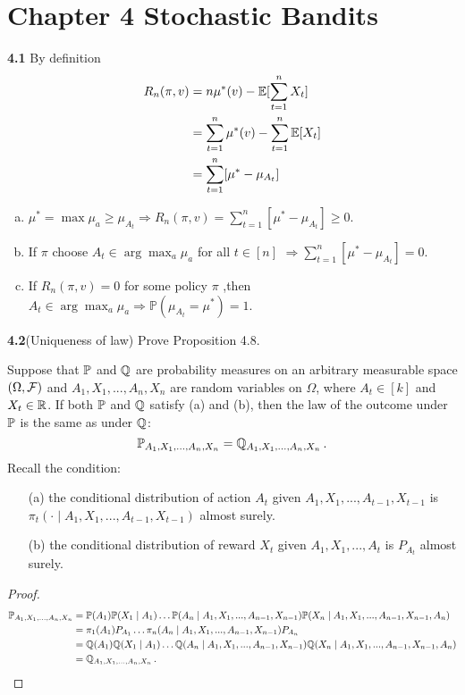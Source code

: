 \chapter*{Chapter 4 Stochastic Bandits}
\label{sec:4}

\noindent\textbf{4.1}
By definition
\begin{align}
R_n(\pi,v) &=n\mu^*(v)-\mathbb{E}[\sum^n_{t=1}X_t]\notag\\
&=\sum^n_{t=1}\mu^*(v)-\sum^n_{t=1}\mathbb{E}[X_t]\notag\\
&=\sum^n_{t=1}[\mu^*-\mu_{A_t}]\notag
\end{align}
\begin{enumerate}[(a)]
    \item $\mu^*=\max\mu_a\ge\mu_{A_t} \Rightarrow R_n(\pi,v)=\sum^n_{t=1}[\mu^*-\mu_{A_t}]\ge0$.

    \item If $\pi$ choose $A_t \in \arg\max_a\mu_a$ for all $t\in[n]$ $\Rightarrow \sum^n_{t=1}[\mu^*-\mu_{A_t}]=0$.

\item If $R_n(\pi,v)=0$ for some policy $\pi$ ,then $A_t \in \arg\max_a\mu_a \Rightarrow \mathbb{P}(\mu_{A_t}=\mu^*)=1$.
\end{enumerate}



\noindent\textbf{4.2}(Uniqueness of law) Prove Proposition 4.8. 
\begin{proposition}
Suppose that $\mathbb{P}$ and $\mathbb{Q}$ are probability measures on an arbitrary measurable space $(\Omega,\mathcal{F})$ and $A_1,X_1,...,A_n,X_n$ are random variables on $\Omega$, where $A_t\in [k]$ and $X_t\in\mathbb{R}$. If both $\mathbb{P}$ and $\mathbb{Q}$ satisfy (a) and (b), then the law of the outcome under $\mathbb{P}$ is the same as under $\mathbb{Q}$: 
$$\mathbb{P}_{A_1,X_1,...,A_n,X_n}=\mathbb{Q}_{A_1,X_1,...,A_n,X_n}\,.$$
Recall the condition:
\begin{enumerate}
    \item[(a)] the conditional distribution of action $A_t$ given $A_1,X_1,...,A_{t-1},X_{t-1}$ is $\pi_t(\cdot \mid A_1,X_1,...,A_{t-1},X_{t-1})$ almost surely.
    \item[(b)] the conditional distribution of reward $X_t$ given $A_1,X_1,...,A_{t}$ is $P_{A_t}$ almost surely.
\end{enumerate}
\end{proposition}

\begin{proof}
    \begin{align*}
        \mathbb{P}_{A_1,X_1,...,A_n,X_n} &= \mathbb{P}(A_1) \mathbb{P}(X_1\mid A_1)\ldots \mathbb{P}(A_n \mid A_1,X_1,...,A_{n-1},X_{n-1}) \mathbb{P}(X_n \mid A_1,X_1,...,A_{n-1},X_{n-1},A_n) \\
        &= \pi_1(A_1) P_{A_1}\ldots \pi_n(A_n\mid A_1,X_1,...,A_{n-1},X_{n-1} ) P_{A_n}\\
        &= \mathbb{Q}(A_1) \mathbb{Q}(X_1\mid A_1)\ldots \mathbb{Q}(A_n \mid A_1,X_1,...,A_{n-1},X_{n-1}) \mathbb{Q}(X_n \mid A_1,X_1,...,A_{n-1},X_{n-1},A_n)\\
        &= \mathbb{Q}_{A_1,X_1,...,A_n,X_n} \,.
    \end{align*}
\end{proof}
    





